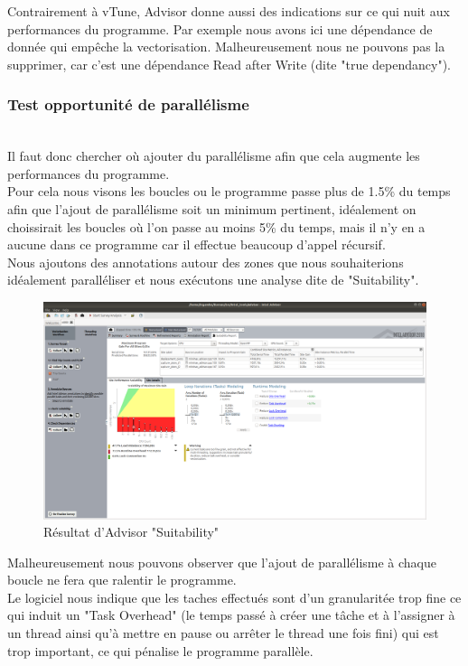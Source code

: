 \documentclass[
 aip,
 jmp,
 amsmath,amssymb,
 reprint
]{revtex4-1}
\begin{document}
Contrairement à vTune, Advisor donne aussi des indications sur ce qui nuit aux performances du programme. Par exemple nous avons ici une dépendance de donnée qui empêche la vectorisation. Malheureusement nous ne pouvons pas la supprimer, car c'est une dépendance Read after Write (dite "true dependancy").\\

\subsubsection{Test opportunité de parallélisme}\mbox{}\\
Il faut donc chercher où ajouter du parallélisme afin que cela augmente les performances du programme.\\
Pour cela nous visons les boucles ou le programme passe plus de 1.5\% du temps afin que l'ajout de parallélisme soit un minimum pertinent, idéalement on choissirait les boucles où l'on passe au moins 5\% du temps, mais il n'y en a aucune dans ce programme car il effectue beaucoup d'appel récursif.\\
Nous ajoutons des annotations autour des zones que nous souhaiterions idéalement paralléliser et nous exécutons une analyse dite de "Suitability".\\

\begin{figure}[H]
  \includegraphics[width=\linewidth, keepaspectratio=true]{suitability.png}
  \caption{Résultat d'Advisor "Suitability"\label{Fig:advisor_suitability}}
\end{figure}

Malheureusement nous pouvons observer que l'ajout de parallélisme à chaque boucle ne fera que ralentir le programme.\\
Le logiciel nous indique que les taches effectués sont d'un granularitée trop fine ce qui induit un "Task Overhead" (le temps passé à créer une tâche et à l'assigner à un thread ainsi qu'à mettre en pause ou arrêter le thread une fois fini) qui est trop important, ce qui pénalise le programme parallèle.\\
\end{document}
